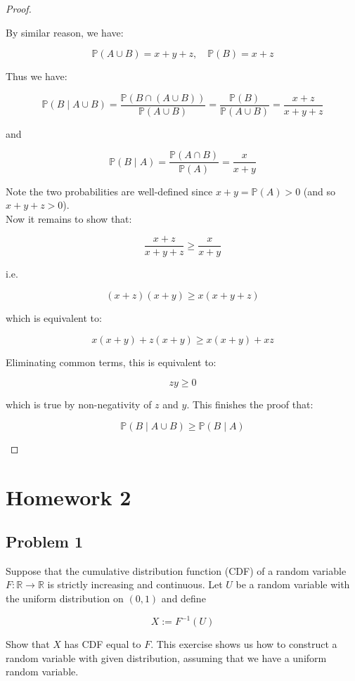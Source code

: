 \documentclass{qlnotes-export}
\begin{document}
\begin{proof}
\begin{itemize}
  By similar reason, we have:

  \[{\mathbb{P}}(A \cup B) = x + y + z,\quad{\mathbb{P}}(B) = x + z\]

  Thus we have:

  \[{\mathbb{P}}(B \mid A \cup B) = \frac{{\mathbb{P}}(B \cap (A \cup B))}{{\mathbb{P}}(A \cup B)} = \frac{{\mathbb{P}}(B)}{{\mathbb{P}}(A \cup B)} = \frac{x + z}{x + y + z}\]

  and

  \[{\mathbb{P}}(B \mid A) = \frac{{\mathbb{P}}(A \cap B)}{{\mathbb{P}}(A)} = \frac{x}{x + y}\]

  Note the two probabilities are well-defined since \(x + y = {\mathbb{P}}(A) > 0\) (and so \(x + y + z > 0\)).\\
  Now it remains to show that:

  \[\frac{x + z}{x + y + z} \geq \frac{x}{x + y}\]

  i.e.

  \[(x + z)(x + y) \geq x(x + y + z)\]

  which is equivalent to:

  \[x(x + y) + z(x + y) \geq x(x + y) + xz\]

  Eliminating common terms, this is equivalent to:

  \[zy \geq 0\]

  which is true by non-negativity of \(z\) and \(y\). This finishes the proof that:

  \[{\mathbb{P}}(B \mid A \cup B) \geq {\mathbb{P}}(B \mid A)\]
\end{itemize}

\end{proof}

\chapter{Homework 2}\label{homework-2}

\section{Problem 1}\label{problem-1-2}

Suppose that the cumulative distribution function (CDF) of a random variable \(F:{\mathbb{R}}\rightarrow{\mathbb{R}}\) is strictly increasing and continuous. Let \(U\) be a random variable with the uniform distribution on \((0,1)\) and define

\[X := F^{- 1}(U)\]

Show that \(X\) has CDF equal to \(F\). This exercise shows us how to construct a random variable with given distribution, assuming that we have a uniform random variable.
\end{document}
